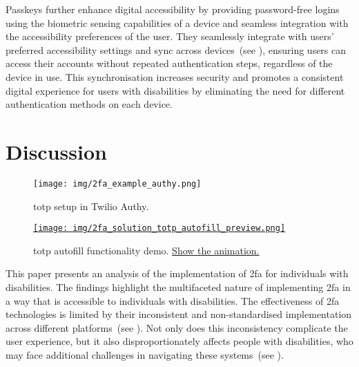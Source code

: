 Passkeys further enhance digital accessibility by providing password-free logins using the biometric sensing capabilities of a device and seamless integration with the accessibility preferences of the user. They seamlessly integrate with users' preferred accessibility settings and sync across devices~(see ), ensuring users can access their accounts without repeated authentication steps, regardless of the device in use. This synchronisation increases security and promotes a consistent digital experience for users with disabilities by eliminating the need for different authentication methods on each device.

\section{Discussion}
\label{sec:discussion}

{\begin{figure}[t]
    \centering
    \texttt{[image: img/2fa\_example\_authy.png]}
    \caption[Caption]{\ac{totp} setup in Twilio Authy.\footnotemark{}}
    \label{fig:totp-now}
\end{figure}
}

{\begin{figure}[t]
    \centering
    \href{https://lngrt.de/totp-autofill-demo}{\texttt{[image: img/2fa\_solution\_totp\_autofill\_preview.png]}}
    \caption[Caption]{\Ac{totp} autofill functionality\footnotemark{} demo. \href{https://lngrt.de/totp-autofill-demo}{Show the animation.}}
    \label{fig:totp-autofill-demo}
\end{figure}
}

This paper presents an analysis of the implementation of \ac{2fa} for individuals with disabilities. The findings highlight the multifaceted nature of implementing \ac{2fa} in a way that is accessible to individuals with disabilities. The effectiveness of \ac{2fa} technologies is limited by their inconsistent and non-standardised implementation across different platforms~(see ). Not only does this inconsistency complicate the user experience, but it also disproportionately affects people with disabilities, who may face additional challenges in navigating these systems~(see ).

